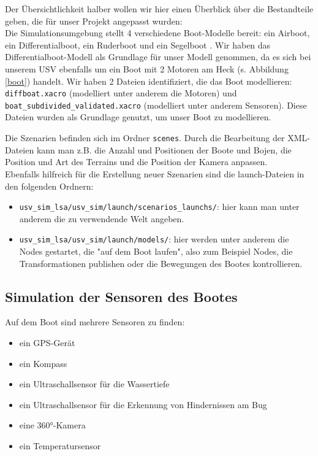 \documentclass[11pt]{article}
\begin{document}
Der Übersichtlichkeit halber wollen wir hier einen Überblick über die Bestandteile geben, die für unser Projekt angepasst wurden:\\
Die Simulationsumgebung stellt 4 verschiedene Boot-Modelle bereit: ein Airboot, ein Differentialboot, ein Ruderboot und ein Segelboot \cite{paravisi2019}. Wir haben das Differentialboot-Modell als Grundlage für unser Modell genommen, da es sich bei unserem USV ebenfalls um ein Boot mit 2 Motoren am Heck (s. Abbildung \ref{boot}) handelt. Wir haben 2 Dateien identifiziert, die das Boot modellieren: \texttt{diffboat.xacro} (modelliert unter anderem die Motoren) und \texttt{boat\_subdivided\_validated.xacro} (modelliert unter anderem Sensoren). Diese Dateien wurden als Grundlage genutzt, um unser Boot zu modellieren.

Die Szenarien befinden sich im Ordner \texttt{scenes}. Durch die Bearbeitung der XML-Dateien kann man z.B. die Anzahl und Positionen der Boote und Bojen, die Position und Art des Terrains und die Position der Kamera anpassen.\\
Ebenfalls hilfreich für die Erstellung neuer Szenarien sind die launch-Dateien in den folgenden Ordnern:

\begin{itemize}
	\item \texttt{usv\_sim\_lsa/usv\_sim/launch/scenarios\_launchs/}: hier kann man unter anderem die zu verwendende Welt angeben.
	\item \texttt{usv\_sim\_lsa/usv\_sim/launch/models/}: hier werden unter anderem die Nodes gestartet, die "auf dem Boot laufen", also zum Beispiel Nodes, die Transformationen publishen oder die Bewegungen des Bootes kontrollieren.
\end{itemize}

\subsection{Simulation der Sensoren des Bootes}

Auf dem Boot sind mehrere Sensoren zu finden:

\begin{itemize}
	\item ein GPS-Gerät
	\item ein Kompass
	\item ein Ultraschallsensor für die Wassertiefe
	\item ein Ultraschallsensor für die Erkennung von Hindernissen am Bug
	\item eine 360°-Kamera
	\item ein Temperatursensor
\end{itemize}
\end{document}
